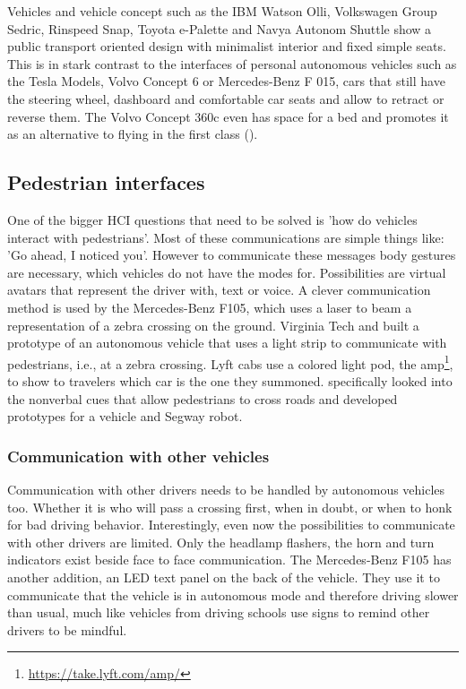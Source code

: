 Vehicles and vehicle concept such as the IBM Watson Olli, Volkswagen Group Sedric, Rinspeed Snap, Toyota e-Palette and Navya Autonom Shuttle show a public transport oriented design with minimalist interior and fixed simple seats. This is in stark contrast to the interfaces of personal autonomous vehicles such as the Tesla Models, Volvo Concept 6 or Mercedes-Benz F 015, cars that still have the steering wheel, dashboard and comfortable car seats and allow to retract or reverse them. The Volvo Concept 360c even has space for a bed and promotes it as an alternative to flying in the first class (\emph{}).   

\subsection{Pedestrian interfaces}\label{ssec:pedestrian}
One of the bigger HCI questions that need to be solved is 'how do vehicles interact with pedestrians'. Most of these communications are simple things like: 'Go ahead, I noticed you'. However to communicate these messages body gestures are necessary, which vehicles do not have the modes for. Possibilities are virtual avatars that represent the driver with, text or voice.  A clever communication method is used by the Mercedes-Benz F105, which uses a laser to beam a representation of a zebra crossing on the ground. Virginia Tech and \cite{FordMotorCompany2017FordPeople} built a prototype of an autonomous vehicle that uses a light strip to communicate with pedestrians, i.e., at a zebra crossing. Lyft cabs use a colored light pod, the amp\footnote{\url{https://take.lyft.com/amp/}}, to show to travelers which car is the one they summoned. \cite{Mahadevan2018} specifically looked into the nonverbal cues that allow pedestrians to cross roads and developed prototypes for a vehicle and Segway robot. 

\subsubsection{Communication with other vehicles} 
Communication with other drivers needs to be handled by autonomous vehicles too. Whether it is who will pass a crossing first, when in doubt, or when to honk for bad driving behavior. Interestingly, even now the possibilities to communicate with other drivers are limited. Only the headlamp flashers, the horn and turn indicators exist beside face to face communication. The Mercedes-Benz F105 has another addition, an LED text panel on the back of the vehicle. They use it to communicate that the vehicle is in autonomous mode and therefore driving slower than usual, much like vehicles from driving schools use signs to remind other drivers to be mindful.  

